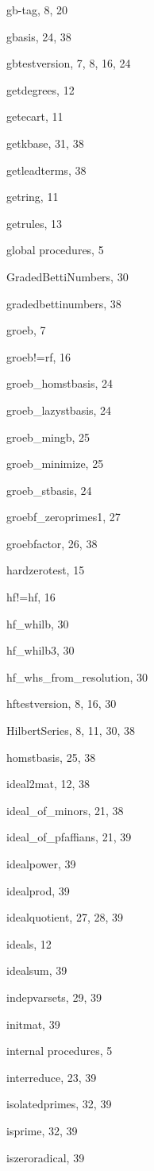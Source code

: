 \begin{theindex}
  \item gb-tag, 8, 20
  \item gbasis, 24, 38
  \item gbtestversion, 7, 8, 16, 24
  \item getdegrees, 12
  \item getecart, 11
  \item getkbase, 31, 38
  \item getleadterms, 38
  \item getring, 11
  \item getrules, 13
  \item global procedures, 5
  \item GradedBettiNumbers, 30
  \item gradedbettinumbers, 38
  \item groeb, 7
  \item groeb!=rf, 16
  \item groeb\_homstbasis, 24
  \item groeb\_lazystbasis, 24
  \item groeb\_mingb, 25
  \item groeb\_minimize, 25
  \item groeb\_stbasis, 24
  \item groebf\_zeroprimes1, 27
  \item groebfactor, 26, 38

  \indexspace

  \item hardzerotest, 15
  \item hf!=hf, 16
  \item hf\_whilb, 30
  \item hf\_whilb3, 30
  \item hf\_whs\_from\_resolution, 30
  \item hftestversion, 8, 16, 30
  \item HilbertSeries, 8, 11, 30, 38
  \item homstbasis, 25, 38

  \indexspace

  \item ideal2mat, 12, 38
  \item ideal\_of\_minors, 21, 38
  \item ideal\_of\_pfaffians, 21, 39
  \item idealpower, 39
  \item idealprod, 39
  \item idealquotient, 27, 28, 39
  \item ideals, 12
  \item idealsum, 39
  \item indepvarsets, 29, 39
  \item initmat, 39
  \item internal procedures, 5
  \item interreduce, 23, 39
  \item isolatedprimes, 32, 39
  \item isprime, 32, 39
  \item iszeroradical, 39


\end{theindex}
